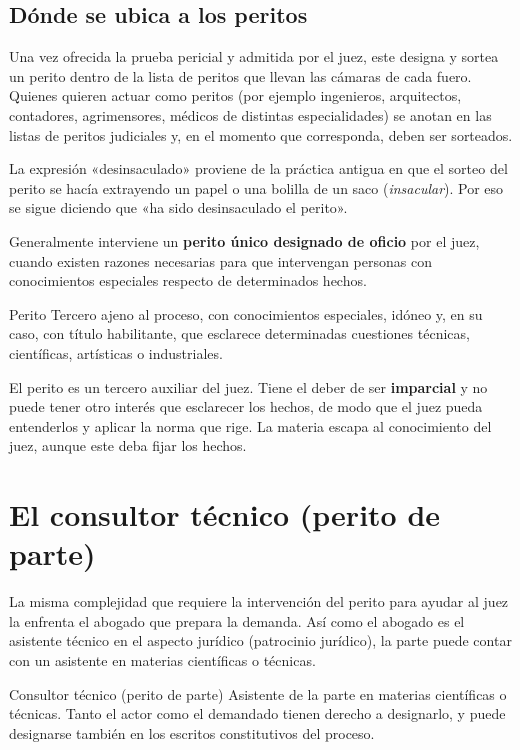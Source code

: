 \documentclass[12pt,oneside]{book}
\begin{document}
\subsection{Dónde se ubica a los peritos}

Una vez ofrecida la prueba pericial y admitida por el juez, este designa y sortea un perito dentro de la lista de peritos que llevan las cámaras de cada fuero. Quienes quieren actuar como peritos (por ejemplo ingenieros, arquitectos, contadores, agrimensores, médicos de distintas especialidades) se anotan en las listas de peritos judiciales y, en el momento que corresponda, deben ser sorteados.

\begin{note}
La expresión «desinsaculado» proviene de la práctica antigua en que el sorteo del perito se hacía extrayendo un papel o una bolilla de un saco (\textit{insacular}). Por eso se sigue diciendo que «ha sido desinsaculado el perito».
\end{note}

Generalmente interviene un \textbf{perito único designado de oficio} por el juez, cuando existen razones necesarias para que intervengan personas con conocimientos especiales respecto de determinados hechos.

\begin{definition}{Perito}
Tercero ajeno al proceso, con conocimientos especiales, idóneo y, en su caso, con título habilitante, que esclarece determinadas cuestiones técnicas, científicas, artísticas o industriales.
\end{definition}

El perito es un tercero auxiliar del juez. Tiene el deber de ser \textbf{imparcial} y no puede tener otro interés que esclarecer los hechos, de modo que el juez pueda entenderlos y aplicar la norma que rige. La materia escapa al conocimiento del juez, aunque este deba fijar los hechos.

\section{El consultor técnico (perito de parte)}

La misma complejidad que requiere la intervención del perito para ayudar al juez la enfrenta el abogado que prepara la demanda. Así como el abogado es el asistente técnico en el aspecto jurídico (patrocinio jurídico), la parte puede contar con un asistente en materias científicas o técnicas.

\begin{definition}{Consultor técnico (perito de parte)}
Asistente de la parte en materias científicas o técnicas. Tanto el actor como el demandado tienen derecho a designarlo, y puede designarse también en los escritos constitutivos del proceso.
\end{definition}
\end{document}
